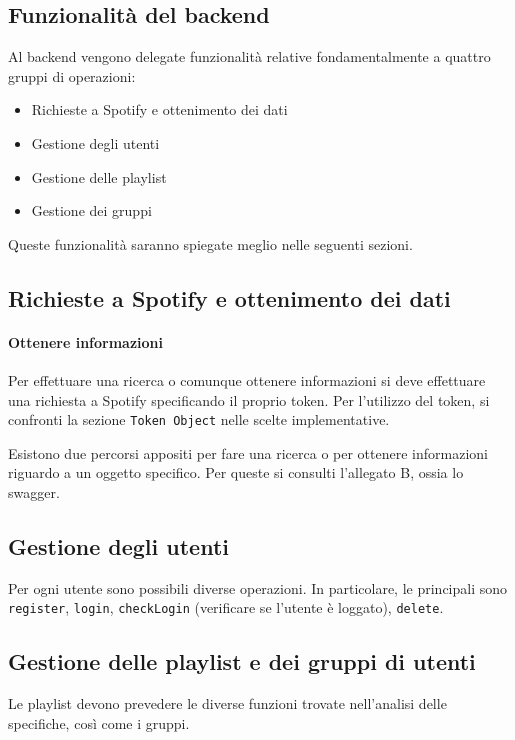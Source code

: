 \subsection{Funzionalità del backend}
Al backend vengono delegate funzionalità relative fondamentalmente a quattro gruppi di operazioni:\begin{itemize}
    \item Richieste a Spotify e ottenimento dei dati
    \item Gestione degli utenti
    \item Gestione delle playlist
    \item Gestione dei gruppi
\end{itemize}
Queste funzionalità saranno spiegate meglio nelle seguenti sezioni.
\subsection{Richieste a Spotify e ottenimento dei dati}
\paragraph{Ottenere informazioni}
Per effettuare una ricerca o comunque ottenere informazioni si deve effettuare una richiesta a Spotify specificando il proprio token. Per l'utilizzo del token, si confronti la sezione \verb|Token Object| nelle scelte implementative.

Esistono due percorsi appositi per fare una ricerca o per ottenere informazioni riguardo a un oggetto specifico. Per queste si consulti l'allegato B, ossia lo swagger.
\subsection{Gestione degli utenti}
Per ogni utente sono possibili diverse operazioni. In particolare, le principali sono \verb|register|, \verb|login|, \verb|checkLogin| (verificare se l'utente è loggato), \verb|delete|.
\subsection{Gestione delle playlist e dei gruppi di utenti}
Le playlist devono prevedere le diverse funzioni trovate nell'analisi delle specifiche, così come i gruppi.

\newpage